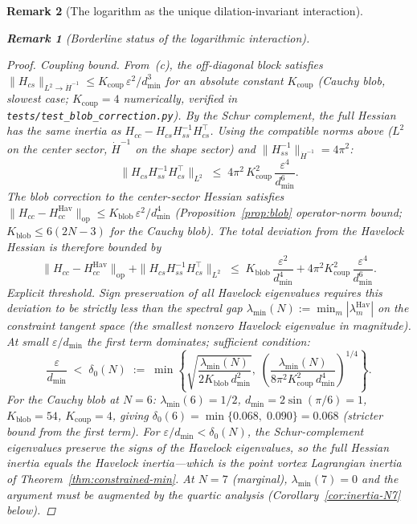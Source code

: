\documentclass[12pt, a4paper]{article}
\newtheorem{remark}{Remark}[section]
\numberwithin{equation}{section}
\begin{document}
\begin{remark}[The logarithm as the unique dilation-invariant interaction]
\begin{remark}[Borderline status of the logarithmic interaction]
\begin{proof}
\emph{Coupling bound.}  From~(c), the off-diagonal block satisfies
$\|H_{cs}\|_{L^2\to \dot H^{-1}} \le K_{\mathrm{coup}}\,
\varepsilon^2/d_{\min}^3$
for an absolute constant $K_{\mathrm{coup}}$ (Cauchy blob, slowest
case; $K_{\mathrm{coup}} = 4$ numerically, verified in
\texttt{tests/test\_blob\_correction.py}).
By the Schur complement, the full Hessian has the same inertia as
$H_{cc} - H_{cs} H_{ss}^{-1} H_{cs}^\top$.  Using the compatible
norms above ($L^2$ on the center sector, $\dot H^{-1}$ on the
shape sector) and $\|H_{ss}^{-1}\|_{\dot H^{-1}} = 4\pi^2$:
\begin{equation}\label{eq:schur-bound-explicit}
  \|H_{cs} H_{ss}^{-1} H_{cs}^\top\|_{L^2}
  \;\le\; 4\pi^2\,K_{\mathrm{coup}}^2\,
  \frac{\varepsilon^4}{d_{\min}^6}.
\end{equation}
The blob correction to the center-sector Hessian satisfies
$\|H_{cc} - H_{cc}^{\mathrm{Hav}}\|_{\mathrm{op}}
\le K_{\mathrm{blob}}\,\varepsilon^2/d_{\min}^4$
(Proposition~\ref{prop:blob} operator-norm bound; $K_{\mathrm{blob}}
\le 6(2N{-}3)$ for the Cauchy blob).
The total deviation from the Havelock Hessian is therefore bounded by
\[
  \|H_{cc} - H_{cc}^{\mathrm{Hav}}\|_{\mathrm{op}}
  + \|H_{cs} H_{ss}^{-1} H_{cs}^\top\|_{L^2}
  \;\le\; K_{\mathrm{blob}}\,\frac{\varepsilon^2}{d_{\min}^4}
  + 4\pi^2 K_{\mathrm{coup}}^2\,\frac{\varepsilon^4}{d_{\min}^6}.
\]
\emph{Explicit threshold.}  Sign preservation of all Havelock
eigenvalues requires this deviation to be strictly less than
the spectral gap $\lambda_{\min}(N) := \min_m |\lambda_m^{\mathrm{Hav}}|$
on the constraint tangent space (the smallest nonzero
Havelock eigenvalue in magnitude).  At small $\varepsilon/d_{\min}$
the first term dominates; sufficient condition:
\begin{equation}\label{eq:inertia-threshold}
  \frac{\varepsilon}{d_{\min}} \;<\; \delta_0(N)
  \;:=\; \min\!\left\{
    \sqrt{\frac{\lambda_{\min}(N)}{2 K_{\mathrm{blob}}\,d_{\min}^2}},\;
    \left(\frac{\lambda_{\min}(N)}{8\pi^2 K_{\mathrm{coup}}^2\,
      d_{\min}^4}\right)^{1/4}
  \right\}.
\end{equation}
For the Cauchy blob at $N = 6$:
$\lambda_{\min}(6) = 1/2$, $d_{\min} = 2\sin(\pi/6) = 1$,
$K_{\mathrm{blob}} = 54$, $K_{\mathrm{coup}} = 4$, giving
$\delta_0(6) = \min\{0.068,\; 0.090\} = 0.068$ (stricter bound
from the first term).  For $\varepsilon/d_{\min} < \delta_0(N)$,
the Schur-complement eigenvalues preserve the signs of the
Havelock eigenvalues, so the full Hessian inertia equals the
Havelock inertia---which is the point vortex Lagrangian inertia of
Theorem~\ref{thm:constrained-min}.  At $N = 7$ (marginal),
$\lambda_{\min}(7) = 0$ and the argument must be augmented by the
quartic analysis (Corollary~\ref{cor:inertia-N7} below).
\end{proof}


\end{remark}
\end{remark}
\end{document}
